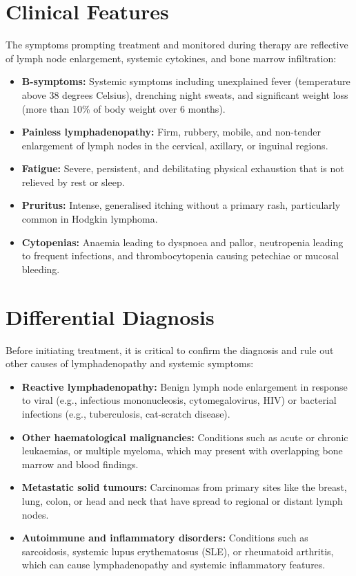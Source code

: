 \section*{Clinical Features}
The symptoms prompting treatment and monitored during therapy are reflective of lymph node enlargement, systemic cytokines, and bone marrow infiltration:
\begin{itemize}
    \item \textbf{B-symptoms:} Systemic symptoms including unexplained fever (temperature above 38 degrees Celsius), drenching night sweats, and significant weight loss (more than 10\% of body weight over 6 months).
    \item \textbf{Painless lymphadenopathy:} Firm, rubbery, mobile, and non-tender enlargement of lymph nodes in the cervical, axillary, or inguinal regions.
    \item \textbf{Fatigue:} Severe, persistent, and debilitating physical exhaustion that is not relieved by rest or sleep.
    \item \textbf{Pruritus:} Intense, generalised itching without a primary rash, particularly common in Hodgkin lymphoma.
    \item \textbf{Cytopenias:} Anaemia leading to dyspnoea and pallor, neutropenia leading to frequent infections, and thrombocytopenia causing petechiae or mucosal bleeding.
\end{itemize}

\section*{Differential Diagnosis}
Before initiating treatment, it is critical to confirm the diagnosis and rule out other causes of lymphadenopathy and systemic symptoms:
\begin{itemize}
    \item \textbf{Reactive lymphadenopathy:} Benign lymph node enlargement in response to viral (e.g., infectious mononucleosis, cytomegalovirus, HIV) or bacterial infections (e.g., tuberculosis, cat-scratch disease).
    \item \textbf{Other haematological malignancies:} Conditions such as acute or chronic leukaemias, or multiple myeloma, which may present with overlapping bone marrow and blood findings.
    \item \textbf{Metastatic solid tumours:} Carcinomas from primary sites like the breast, lung, colon, or head and neck that have spread to regional or distant lymph nodes.
    \item \textbf{Autoimmune and inflammatory disorders:} Conditions such as sarcoidosis, systemic lupus erythematosus (SLE), or rheumatoid arthritis, which can cause lymphadenopathy and systemic inflammatory features.
\end{itemize}

